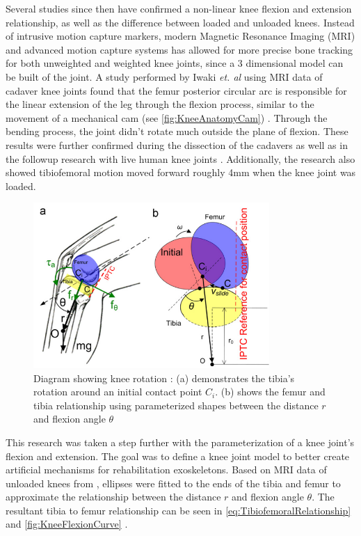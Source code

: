 Several studies since then have confirmed a non-linear knee flexion and extension relationship, as well as the difference between loaded and unloaded knees. Instead of intrusive motion capture markers, modern Magnetic Resonance Imaging (MRI) and advanced motion capture systems \cite{ModelAnalysisDeepKneeFlexion} has allowed for more precise bone tracking for both unweighted and weighted knee joints, since a 3 dimensional model can be built of the joint. A study performed by Iwaki \textit{et. al} using MRI data of cadaver knee joints found that the femur posterior circular arc is responsible for the linear extension of the leg through the flexion process, similar to the movement of a mechanical cam (see \autoref{fig:KneeAnatomyCam}) \cite{MRIKneeShape_Unloaded}. Through the bending process, the joint didn't rotate much outside the plane of flexion. These results were further confirmed during the dissection of the cadavers as well as in the followup research with live human knee joints \cite{MRIKneeShape_Loaded}. Additionally, the research also showed tibiofemoral motion moved forward roughly 4mm when the knee joint was loaded.

\begin{figure}[ht!]
    \centering
    \includegraphics[width=0.8\textwidth]{Figures/Background/KneeParameterization.png}
    \caption{Diagram showing knee rotation \cite{KinDynKneeJoint}: (a) demonstrates the tibia's rotation around an initial contact point \(C_i\). (b) shows the femur and tibia relationship using parameterized shapes between the distance \(r\) and flexion angle \(\theta\)}
    \label{fig:KneeParameterization}
\end{figure}

This research was taken a step further with the parameterization of a knee joint's flexion and extension. The goal was to define a knee joint model to better create artificial mechanisms for rehabilitation exoskeletons. Based on MRI data of unloaded knees from \cite{MRIKneeShape_Unloaded}, ellipses were fitted to the ends of the tibia and femur to approximate the relationship between the distance \(r\) and flexion angle \(\theta\). The resultant tibia to femur relationship can be seen in \autoref{eq:TibiofemoralRelationship} and \autoref{fig:KneeFlexionCurve} \cite{KinDynKneeJoint}.


